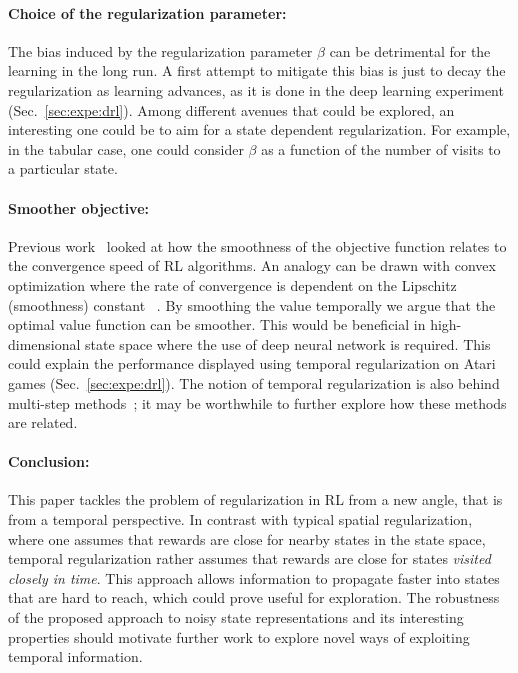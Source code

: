 \documentclass{article}
\newcommand{\param}{\beta}
\begin{document}
\paragraph{Choice of the regularization parameter:}

The bias induced by the regularization parameter $\param$ can be detrimental for the learning in the long run. A first attempt to mitigate this bias is just to decay the regularization as learning advances, as it is done in the deep learning experiment (Sec.~\ref{sec:expe:drl}). Among different avenues that could be explored, an interesting one could be to aim for a state dependent regularization. For example, in the tabular case, one could consider $\param$ as a function of the number of visits to a particular state.
\paragraph{Smoother objective:}

Previous work~\cite{smooth_value} looked at how the smoothness of the objective function relates to the convergence speed of RL algorithms.  An analogy can be drawn with convex optimization where the rate of convergence is dependent on the Lipschitz (smoothness) constant ~\cite{boyd2004convex}. 
By smoothing the value temporally we argue that the optimal value function can be smoother. This would be beneficial in high-dimensional state space where the use of deep neural network is required. This could explain the performance displayed using temporal regularization on Atari games (Sec.~\ref{sec:expe:drl}).
The notion of temporal regularization is also behind multi-step methods~\citep{sutton1998reinforcement}; it may be worthwhile to further explore how these methods are related.

\paragraph{Conclusion:}

This paper tackles the problem of regularization in RL from a new angle, that is from a temporal perspective. In contrast with typical spatial regularization, where one assumes that rewards are close for nearby states in the state space, temporal regularization rather assumes that rewards are close for states \emph{visited closely in time}. This approach allows information to propagate faster into states that are hard to reach, which could prove useful for exploration. The robustness of the proposed approach to noisy state representations and its interesting properties should motivate further work to explore novel ways of exploiting temporal information.
\end{document}

